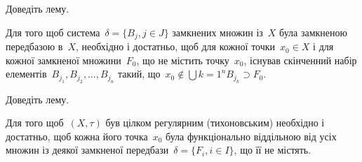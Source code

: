 \begin{exercise}
    Доведіть лему.
\end{exercise}

\begin{lemma}
    Для того щоб система~$\delta = \{B_j, j \in J\}$ замкнених множин із~$X$ була замкненою передбазою в~$X$, необхідно і достатньо, щоб для кожної точки~$x_0 \in X$ і для кожної замкненої множини~$F_0$, що не містить точку~$x_0$, існував скінченний набір елементів~$B_{j_1}, B_{j_2}, \ldots, B_{j_n}$ такий, що~$x_0 \notin \bigcup{k = 1}^n B_{j_k} \supset F_0$.
\end{lemma}

\begin{exercise}
    Доведіть лему.
\end{exercise}

\begin{theorem}
    Для того щоб~$(X, \tau)$ був цілком регулярним (тихоновським) необхідно і достатньо, щоб кожна його точка~$x_0$ була функціонально віддільною від усіх множин із деякої замкненої передбази~$\delta = \{F_i, i \in I\}$, що її не містять.
\end{theorem}

